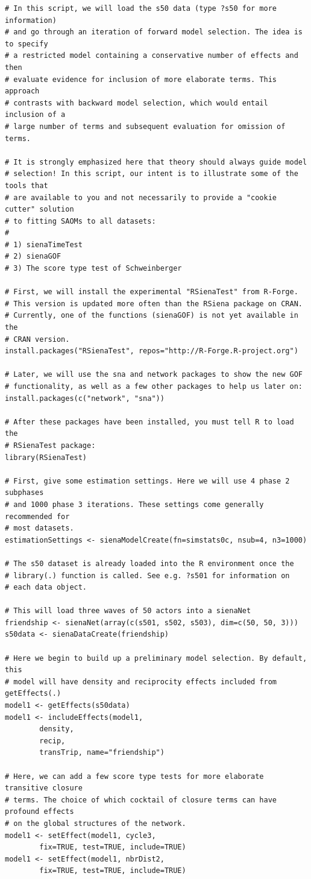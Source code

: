 \documentclass[a4paper,fleqn,11pt]{article}
\newcommand{\+}{\, + \,}
\begin{document}
{\begin{footnotesize}
\begin{verbatim}
# In this script, we will load the s50 data (type ?s50 for more information)
# and go through an iteration of forward model selection. The idea is to specify
# a restricted model containing a conservative number of effects and then
# evaluate evidence for inclusion of more elaborate terms. This approach
# contrasts with backward model selection, which would entail inclusion of a
# large number of terms and subsequent evaluation for omission of terms.

# It is strongly emphasized here that theory should always guide model
# selection! In this script, our intent is to illustrate some of the tools that
# are available to you and not necessarily to provide a "cookie cutter" solution
# to fitting SAOMs to all datasets:
#
# 1) sienaTimeTest
# 2) sienaGOF
# 3) The score type test of Schweinberger

# First, we will install the experimental "RSienaTest" from R-Forge.
# This version is updated more often than the RSiena package on CRAN.
# Currently, one of the functions (sienaGOF) is not yet available in the
# CRAN version.
install.packages("RSienaTest", repos="http://R-Forge.R-project.org")

# Later, we will use the sna and network packages to show the new GOF
# functionality, as well as a few other packages to help us later on:
install.packages(c("network", "sna"))

# After these packages have been installed, you must tell R to load the
# RSienaTest package:
library(RSienaTest)

# First, give some estimation settings. Here we will use 4 phase 2 subphases
# and 1000 phase 3 iterations. These settings come generally recommended for
# most datasets.
estimationSettings <- sienaModelCreate(fn=simstats0c, nsub=4, n3=1000)

# The s50 dataset is already loaded into the R environment once the
# library(.) function is called. See e.g. ?s501 for information on
# each data object.

# This will load three waves of 50 actors into a sienaNet
friendship <- sienaNet(array(c(s501, s502, s503), dim=c(50, 50, 3)))
s50data <- sienaDataCreate(friendship)

# Here we begin to build up a preliminary model selection. By default, this
# model will have density and reciprocity effects included from getEffects(.)
model1 <- getEffects(s50data)
model1 <- includeEffects(model1,
		density,
		recip,
		transTrip, name="friendship")

# Here, we can add a few score type tests for more elaborate transitive closure
# terms. The choice of which cocktail of closure terms can have profound effects
# on the global structures of the network.
model1 <- setEffect(model1, cycle3,
		fix=TRUE, test=TRUE, include=TRUE)
model1 <- setEffect(model1, nbrDist2,
		fix=TRUE, test=TRUE, include=TRUE)


\end{verbatim}
\end{footnotesize}}
\end{document}
